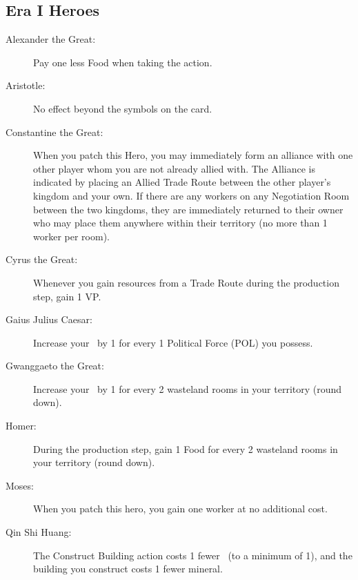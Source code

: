 \documentclass[10pt,twocolumn]{article}
\begin{document}
\begin{appendices}
\subsection{Era I Heroes}
\begin{description}
\item[Alexander the Great:] Pay one less Food when taking the  action.
\item[Aristotle:] No effect beyond the symbols on the card.
\item[Constantine the Great:] When you patch this Hero, you may immediately form an alliance with one other player whom you are not already allied with. The Alliance is indicated by placing an Allied Trade Route between the other player's kingdom and your own. If there are any workers on any Negotiation Room between the two kingdoms, they are immediately returned to their owner who may place them anywhere within their territory (no more than 1 worker per room).
\item[Cyrus the Great:] Whenever you gain resources from a Trade Route during the production step, gain 1 VP.
\item[Gaius Julius Caesar:] Increase your \mil\ by 1 for every 1 Political Force (POL) you possess.
\item[Gwanggaeto the Great:] Increase your \mil\ by 1 for every 2 wasteland rooms in your territory (round down).
\item[Homer:] During the production step, gain 1 Food for every 2 wasteland rooms in your territory (round down).
\item[Moses:] When you patch this hero, you gain one worker at no additional cost.
\item[Qin Shi Huang:] The Construct Building action costs 1 fewer \polf\ (to a minimum of 1), and the building you construct costs 1 fewer mineral.
\end{description}

\end{appendices}
\end{document}
